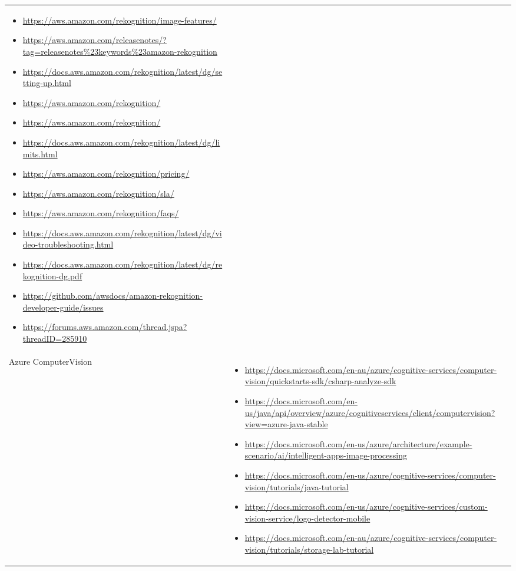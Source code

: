 {\begin{longtable}{p{.2\linewidth}|p{.725\linewidth}}
\begin{itemize}[label=,leftmargin=10pt,topsep=0pt,partopsep=0pt,noitemsep,nolistsep,itemindent=-10pt]
\item \url{https://aws.amazon.com/rekognition/image-features/}
\item \url{https://aws.amazon.com/releasenotes/?tag=releasenotes\%23keywords\%23amazon-rekognition}
\item \url{https://docs.aws.amazon.com/rekognition/latest/dg/setting-up.html}
\item \url{https://aws.amazon.com/rekognition/}
\item \url{https://aws.amazon.com/rekognition/}
\item \url{https://docs.aws.amazon.com/rekognition/latest/dg/limits.html}
\item \url{https://aws.amazon.com/rekognition/pricing/}
\item \url{https://aws.amazon.com/rekognition/sla/}
\item \url{https://aws.amazon.com/rekognition/faqs/}
\item \url{https://docs.aws.amazon.com/rekognition/latest/dg/video-troubleshooting.html}
\item \url{https://docs.aws.amazon.com/rekognition/latest/dg/rekognition-dg.pdf}
\item \url{https://github.com/awsdocs/amazon-rekognition-developer-guide/issues}
\item \url{https://forums.aws.amazon.com/thread.jspa?threadID=285910}
    \end{itemize}\\
    Azure Computer\newline Vision &
    \vspace{-1.75mm}
    \begin{itemize}[label=,leftmargin=10pt,topsep=0pt,partopsep=0pt,noitemsep,nolistsep,itemindent=-10pt]
\item \url{https://docs.microsoft.com/en-au/azure/cognitive-services/computer-vision/quickstarts-sdk/csharp-analyze-sdk}
\item \url{https://docs.microsoft.com/en-us/java/api/overview/azure/cognitiveservices/client/computervision?view=azure-java-stable}
\item \url{https://docs.microsoft.com/en-us/azure/architecture/example-scenario/ai/intelligent-apps-image-processing}
\item \url{https://docs.microsoft.com/en-us/azure/cognitive-services/computer-vision/tutorials/java-tutorial}
\item \url{https://docs.microsoft.com/en-us/azure/cognitive-services/custom-vision-service/logo-detector-mobile}
\item \url{https://docs.microsoft.com/en-au/azure/cognitive-services/computer-vision/tutorials/storage-lab-tutorial}

\end{itemize}
\end{longtable}}
